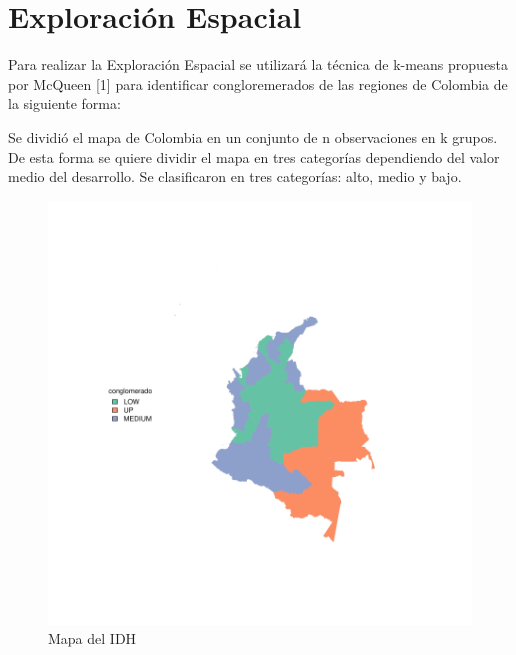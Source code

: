\documentclass{article}
\begin{document}
\clearpage

\section{Exploraci\'on Espacial}

Para realizar la Exploraci\'on Espacial se utilizar\'a la t\'ecnica de k-means propuesta por McQueen [1] para identificar congloremerados de las regiones de Colombia de la siguiente forma:

Se dividi\'o el mapa de Colombia en un conjunto de n observaciones en k grupos. De esta forma se quiere dividir el mapa en tres categor\'ias dependiendo del valor medio del desarrollo. Se clasificaron en tres categor\'ias: alto, medio y bajo.







\begin{figure}[h]
\centering

\includegraphics{FinaldeR3-plotMap1}

\caption{Mapa del IDH}
\label{map}
\end{figure}


\renewcommand{\refname}{Bibliograf\'ia}

\end{document}
